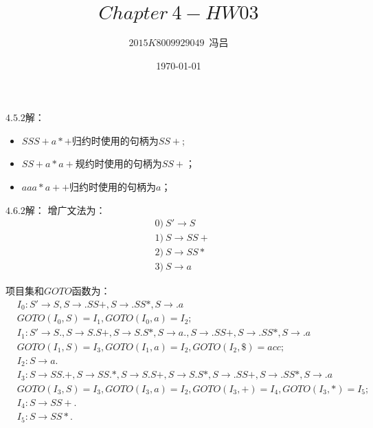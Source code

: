 \documentclass[UTF8,noindent]{ctexart}
\title{$Chapter\ 4-HW03$}
\author{$2015K8009929049$\ 冯吕}
\date{\today}
\begin{document}
\maketitle
{}
$4.5.2$解：
\begin{itemize}
  \item $SS S+a*+$归约时使用的句柄为$SS+$;
	\item $SS+a*a+$规约时使用的句柄为$SS+$；
	  \item $aaa*a++$归约时使用的句柄为$a$；
\end{itemize}

$4.6.2$解：
增广文法为：
\begin{align*}
&0)\ S'\rightarrow S\\
  &1)\ S\rightarrow SS+\\
&2)\ S\rightarrow SS*\\
  &3)\ S\rightarrow a
\end{align*}

项目集和$GOTO$函数为：
\begin{align*}
  &I_0 : S'\rightarrow S, S\rightarrow .SS+, S\rightarrow .SS*, S\rightarrow .a \\
  & GOTO(I_0, S) = I_1, GOTO(I_0, a) = I_2;\\
  &I_1 :  S'\rightarrow S., S\rightarrow S.S+, S\rightarrow S.S*, S\rightarrow a., S\rightarrow .SS+, S\rightarrow .SS*, S\rightarrow .a \\
  &GOTO(I_1, S) = I_3, GOTO(I_1, a) = I_2, GOTO(I_2, \$) = acc;\\
  &I_2 :  S\rightarrow a. \\ 
  &I_3 : S\rightarrow SS.+, S\rightarrow SS.*, S\rightarrow S.S+, S\rightarrow S.S*, S\rightarrow .SS+, S\rightarrow .SS*, S\rightarrow .a\\
  & GOTO(I_3, S) = I_3, GOTO(I_3, a) = I_2, GOTO(I_3, +) = I_4, GOTO(I_3, *) = I_5;\\
  &I_4 :  S\rightarrow SS+.\\
  &I_5 :  S\rightarrow SS*.
\end{align*}
\end{document}
